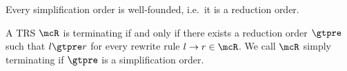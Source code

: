 \begin{lemma}
Every simplification order is well-founded, i.e.~it is a reduction order.
\end{lemma}
%
\begin{theorem}
A TRS \( \mcR \) is terminating if and only if there exists a reduction order \( \gtpre \)
such that \( l\gtpre r \) for every rewrite rule \( l\rightarrow r\in\mcR \).
We call \( \mcR \) simply terminating if \( \gtpre \) is a simplification order.
\end{theorem}


